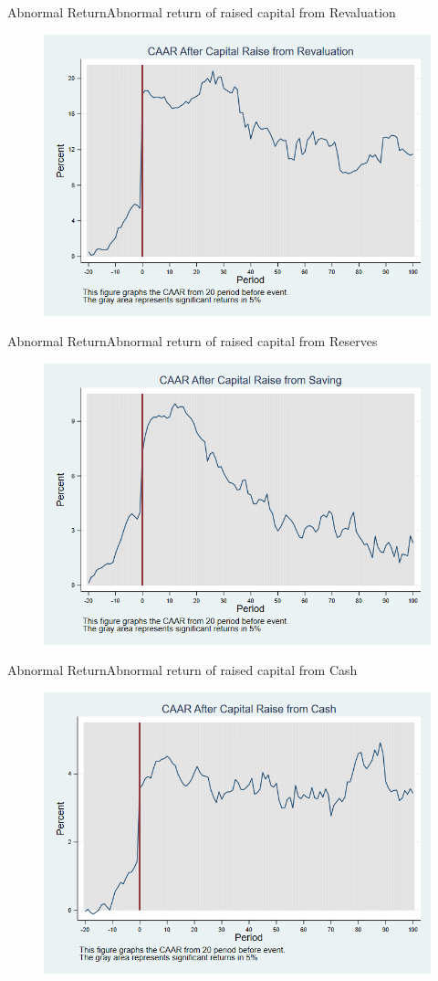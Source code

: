 \documentclass{beamer}
\begin{document}
	\begin{frame}{Abnormal Return}{Abnormal return of raised capital from Revaluation}
		\label{car_marketRevaluation}
		\begin{figure}
			\centering
			\includegraphics[width=0.65\linewidth]{Output/car_marketRevaluation}
			\label{fig:car_marketRevaluation}
		\end{figure}
		
	\end{frame}
	
	
	\begin{frame}{Abnormal Return}{Abnormal return of raised capital from Reserves}
		\label{car_marketSaving}
		\begin{figure}
			\centering
			\includegraphics[width=0.65\linewidth]{Output/car_marketSaving}
			\label{fig:car_marketSaving}
		\end{figure}
		
	\end{frame}
	
	
	\begin{frame}{Abnormal Return}{Abnormal return of raised capital from Cash}
		\label{car_marketCash}
		\begin{figure}
			\centering
			\includegraphics[width=0.65\linewidth]{Output/car_marketCash}
			\label{fig:car_marketCash}
		\end{figure}
	\end{frame}
	
\end{document}
